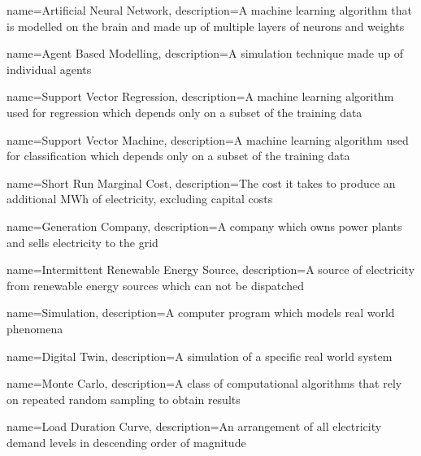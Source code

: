 {
        name=Artificial Neural Network,
        description={A machine learning algorithm that is modelled on the brain and made up of multiple layers of neurons and weights}
}

{
        name=Agent Based Modelling,
        description={A simulation technique made up of individual agents}
}

{
        name=Support Vector Regression,
        description={A machine learning algorithm used for regression which depends only on a subset of the training data}
}



{
	name=Support Vector Machine,
	description={A machine learning algorithm used for classification which depends only on a subset of the training data}
}

{
	name=Short Run Marginal Cost,
	description={The cost it takes to produce an additional MWh of electricity, excluding capital costs}
}

{
	name=Generation Company,
	description={A company which owns power plants and sells electricity to the grid}
}

{
	name=Intermittent Renewable Energy Source,
	description={A source of electricity from renewable energy sources which can not be dispatched}
}

{
	name=Simulation,
	description={A computer program which models real world phenomena}
}

{
	name=Digital Twin,
	description={A simulation of a specific real world system}
}

{
	name=Monte Carlo,
	description={A class of computational algorithms that rely on repeated random sampling to obtain results}
}

{
	name=Load Duration Curve,
	description={An arrangement of all electricity demand levels in descending order of magnitude}
}











